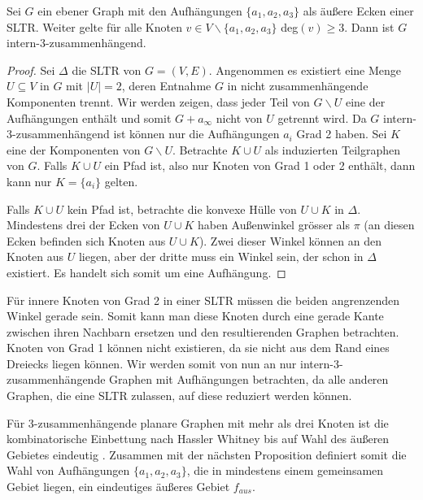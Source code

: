 \begin{proposition}\cite[Proposition 1.2]{af13}
Sei $G$ ein ebener Graph mit den Aufhängungen $\{a_1,a_2,a_3\}$ als äußere Ecken einer SLTR. Weiter gelte für alle Knoten $v\in V \backslash \{a_1,a_2,a_3\}$ deg$(v) \geq 3$. Dann ist $G$ intern-3-zusammenhängend.
\end{proposition}

\begin{proof}
Sei $\Delta$ die SLTR von $G=(V,E)$. Angenommen es existiert eine Menge $U \subseteq V$ in $G$ mit $|U| = 2$, deren Entnahme $G$ in nicht zusammenhängende Komponenten trennt. Wir werden zeigen, dass jeder Teil von $G\backslash U$ eine der Aufhängungen enthält und somit $G + a_\infty$ nicht von $U$ getrennt wird. Da $G$ intern-3-zusammenhängend ist können nur die Aufhängungen $a_i$ Grad 2 haben. Sei $K$ eine der Komponenten von $G\backslash U$. Betrachte $K\cup U$ als induzierten Teilgraphen von $G$. Falls $K\cup U$ ein Pfad ist, also nur Knoten von Grad 1 oder 2 enthält, dann kann nur $K=\{a_i\}$ gelten.

Falls $K\cup U$ kein Pfad ist, betrachte die konvexe Hülle von $U \cup K$ in $\Delta$. Mindestens drei der Ecken von $U \cup K$ haben Außenwinkel grösser als $\pi$ (an diesen Ecken befinden sich Knoten aus $U \cup K$). Zwei dieser Winkel können an den Knoten aus $U$ liegen, aber der dritte muss ein Winkel sein, der schon in $\Delta$ existiert. Es handelt sich somit um eine Aufhängung.
\end{proof}

\begin{remark}
Für innere Knoten von Grad 2 in einer SLTR müssen die beiden angrenzenden Winkel gerade sein. Somit kann man diese Knoten durch eine gerade Kante zwischen ihren Nachbarn ersetzen und den resultierenden Graphen betrachten. Knoten von Grad 1 können nicht existieren, da sie nicht aus dem Rand eines Dreiecks liegen können. Wir werden somit von nun an nur intern-3-zusammenhängende Graphen mit Aufhängungen betrachten, da alle anderen Graphen, die eine SLTR zulassen, auf diese reduziert werden können.
\end{remark}

Für 3-zusammenhängende planare Graphen mit mehr als drei Knoten ist die kombinatorische Einbettung nach Hassler Whitney bis auf Wahl des äußeren Gebietes eindeutig \cite{whitney32}. Zusammen mit der nächsten Proposition definiert somit die Wahl von Aufhängungen $\{a_1,a_2,a_3\}$, die in mindestens einem gemeinsamen Gebiet liegen, ein eindeutiges äußeres Gebiet $f_{aus}$.

